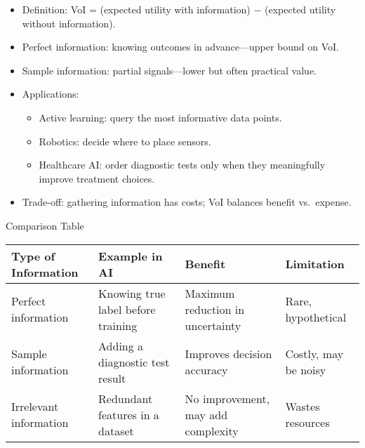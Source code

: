 \documentclass[
  letterpaper,
  DIV=11,
  numbers=noendperiod]{scrreprt}
\providecommand{\tightlist}{%
  \setlength{\itemsep}{0pt}\setlength{\parskip}{0pt}}
\begin{document}
\begin{itemize}
\item
  Definition: VoI = (expected utility with information) − (expected
  utility without information).
\item
  Perfect information: knowing outcomes in advance---upper bound on VoI.
\item
  Sample information: partial signals---lower but often practical value.
\item
  Applications:

  \begin{itemize}
  \tightlist
  \item
    Active learning: query the most informative data points.
  \item
    Robotics: decide where to place sensors.
  \item
    Healthcare AI: order diagnostic tests only when they meaningfully
    improve treatment choices.
  \end{itemize}
\item
  Trade-off: gathering information has costs; VoI balances benefit
  vs.~expense.
\end{itemize}

Comparison Table

\begin{longtable}[]{@{}
  >{\raggedright\arraybackslash}p{}
  >{\raggedright\arraybackslash}p{}
  >{\raggedright\arraybackslash}p{}
  >{\raggedright\arraybackslash}p{}@{}}
\toprule\noalign{}
\begin{minipage}[b]{\linewidth}\raggedright
Type of Information
\end{minipage} & \begin{minipage}[b]{\linewidth}\raggedright
Example in AI
\end{minipage} & \begin{minipage}[b]{\linewidth}\raggedright
Benefit
\end{minipage} & \begin{minipage}[b]{\linewidth}\raggedright
Limitation
\end{minipage} \\
\midrule\noalign{}
\endhead
\bottomrule\noalign{}
\endlastfoot
Perfect information & Knowing true label before training & Maximum
reduction in uncertainty & Rare, hypothetical \\
Sample information & Adding a diagnostic test result & Improves decision
accuracy & Costly, may be noisy \\
Irrelevant information & Redundant features in a dataset & No
improvement, may add complexity & Wastes resources \\
\end{longtable}
\end{document}
